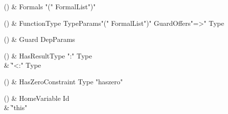 \begin{bbgrammarappendix}

() & Formals \label{prod:Formals}  \: \xcd"(" FormalList\opt \xcd")"  \\


\end{bbgrammarappendix}

\begin{bbgrammarappendix}

() & FunctionType \label{prod:FunctionType}  \: TypeParams\opt \xcd"(" FormalList\opt \xcd")" Guard\opt Offers\opt \xcd"=>" Type  \\


\end{bbgrammarappendix}

\begin{bbgrammarappendix}

() & Guard \label{prod:Guard}  \: DepParams  \\


\end{bbgrammarappendix}

\begin{bbgrammarappendix}

() & HasResultType \label{prod:HasResultType}  \: \xcd":" Type  \\

 &    \| \xcd"<:" Type \\

\end{bbgrammarappendix}

\begin{bbgrammarappendix}

() & HasZeroConstraint \label{prod:HasZeroConstraint}  \: Type  \xcd"haszero"  \\


\end{bbgrammarappendix}

\begin{bbgrammarappendix}

() & HomeVariable \label{prod:HomeVariable}  \: Id  \\

 &    \| \xcd"this" \\

\end{bbgrammarappendix}

